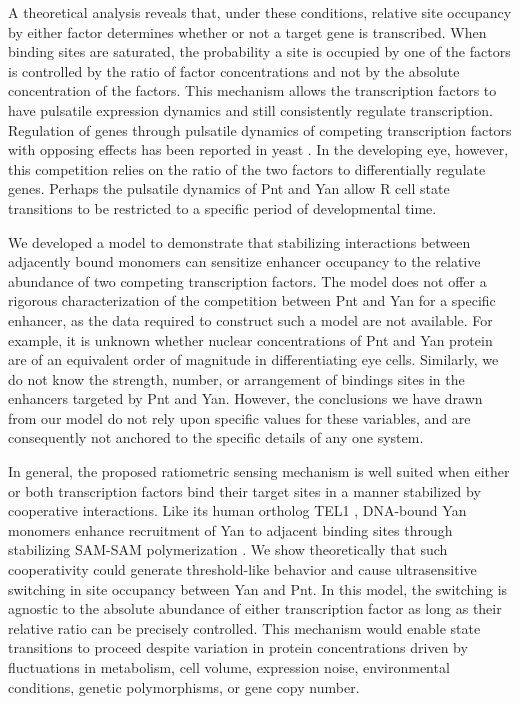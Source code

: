 A theoretical analysis reveals that, under these conditions, relative site occupancy by either factor determines whether or not a target gene is transcribed. When binding sites are saturated, the probability a site is occupied by one of the factors is controlled by the ratio of factor concentrations and not by the absolute concentration of the factors. This mechanism allows the transcription factors to have pulsatile expression dynamics and still consistently regulate transcription. Regulation of genes through pulsatile dynamics of competing transcription factors with opposing effects has been reported in yeast \cite{Lin2015}. In the developing eye, however, this competition relies on the ratio of the two factors to differentially regulate genes. Perhaps the pulsatile dynamics of Pnt and Yan allow R cell state transitions to be restricted to a specific period of developmental time.

We developed a model to demonstrate that stabilizing interactions between adjacently bound monomers can sensitize enhancer occupancy to the relative abundance of two competing transcription factors. The model does not offer a rigorous characterization of the competition between Pnt and Yan for a specific enhancer, as the data required to construct such a model are not available. For example, it is unknown whether nuclear concentrations of Pnt and Yan protein are of an equivalent order of magnitude in differentiating eye cells. Similarly, we do not know the strength, number, or arrangement of bindings sites in the enhancers targeted by Pnt and Yan. However, the conclusions we have drawn from our model do not rely upon specific values for these variables, and are consequently not anchored to the specific details of any one system. 

In general, the proposed ratiometric sensing mechanism is well suited when either or both transcription factors bind their target sites in a manner stabilized by cooperative interactions. Like its human ortholog TEL1 \cite{Kim2001}, DNA-bound Yan monomers enhance recruitment of Yan to adjacent binding sites through stabilizing SAM-SAM polymerization \cite{Zhang2010}. We show theoretically that such cooperativity could generate threshold-like behavior and cause ultrasensitive switching in site occupancy between Yan and Pnt. In this model, the switching is agnostic to the absolute abundance of either transcription factor as long as their relative ratio can be precisely controlled. This mechanism would enable state transitions to proceed despite variation in protein concentrations driven by fluctuations in metabolism, cell volume, expression noise, environmental conditions, genetic polymorphisms, or gene copy number.

